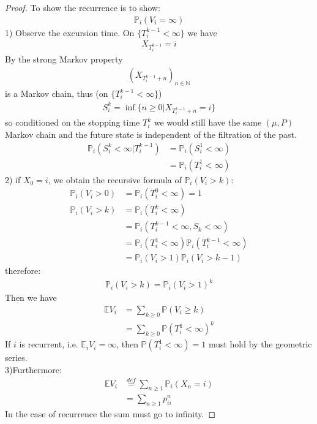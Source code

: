\documentclass[a4paper,11pt]{book}
\theoremstyle{definition}
\theoremstyle{remark}
\begin{document}
\begin{proof}
	To show the recurrence is to show:
	\begin{align*}
		\mathbb{P}_i(V_i = \infty)
	\end{align*}
	1) Observe the excursion time. On $\{T_i^{k -1} < \infty\}$ we have 
	\begin{align*}
		X_{T_i^{k-1}} = i
	\end{align*}
	By the strong Markov property
	\begin{align*}
		(X_{T_i^{k-1} + n})_{n \in \mathbb{N}}
	\end{align*}
	is a Markov chain, thus (on $\{T_i^{k-1} < \infty \}$)
	\begin{align*}
		S_i^k = \inf \{n \geq 0| X_{T_i^{k-1} + n} = i\}
	\end{align*}
	so conditioned on the stopping time $T_i^k$ we would still have the same $(\mu, P)$ Markov chain and the future state is independent of the filtration of the past.
	\begin{align*}
		\mathbb{P}_i(S_i^k < \infty | T_i^{k-1}) & = \mathbb{P}_i(S_i^1 < \infty)\\
		&= \mathbb{P}_i(T_i^1 < \infty)
	\end{align*}
	2)
	if $X_0= i$, we obtain the recursive formula of $\mathbb{P}_i(V_i > k)$:
	\begin{align*}
		\mathbb{P}_i(V_i > 0) &= \mathbb{P}_i(T_i^0 < \infty ) = 1\\
		\mathbb{P}_i(V_i > k) &= \mathbb{P}_i(T_i^k < \infty)\\
		&= \mathbb{P}_i(T_i^{k-1} < \infty, S_k < \infty)\\
		&= \mathbb{P}_i(T_i^1 < \infty) \mathbb{P}_i(T_i^{k-1} < \infty)\\
		&= \mathbb{P}_i(V_i > 1)	\mathbb{P}_i(V_i > k-1)
\end{align*}
therefore:
\begin{align*}
	\mathbb{P}_i(V_i > k) = \mathbb{P}_i(V_i > 1)^k
\end{align*}
Then we have
	\begin{align*}
		\mathbb{E}V_i &= \sum_{k \geq 0} \mathbb{P}(V_i \geq k)\\
		&= \sum_{k \geq 0} \mathbb{P}(T_i^1< \infty)^k  
	\end{align*}
If $i$ is recurrent, i.e. $\mathbb{E}_iV_i = \infty$, then $\mathbb{P}(T_i^1 < \infty) = 1 $ must hold by the geometric series.\\
3)Furthermore:
	\begin{align*}
		\mathbb{E} V_i &\overset{def}{=} \sum_{n \geq 1} \mathbb{P}_i(X_n = i)\\
		&= \sum_{n \geq 1} p_{ii}^n 
	\end{align*}
	In the case of recurrence the sum must go to infinity.
\end{proof}
\end{document}
